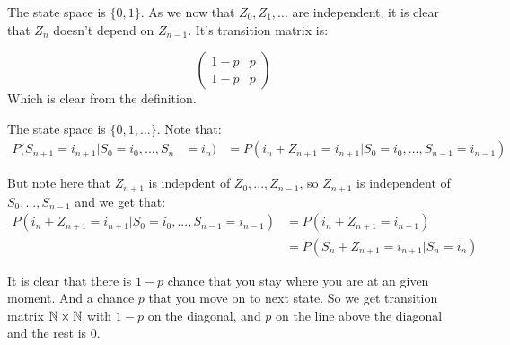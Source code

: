 
\beginproof
The state space is $\{0,1\}$. As we now that $Z_0,Z_1,...$ are independent, it is clear that $Z_n$ doesn't depend on $Z_{n-1}$. It's transition matrix is:

\[\begin{pmatrix}
1-p & p\\ 
1-p & p
\end{pmatrix}\]
Which is clear from the definition.\endproof


\beginproof
The state space is $\{0,1,...\}$.
Note that:
\begin{align*}
P(S_{n+1} = i_{n+1} | S_0 = i_0,...,S_{n} &=i_{n}) &= P(i_n+Z_{n+1}=i_{n+1} | S_0 = i_0,...,S_{n-1}=i_{n-1} )
\end{align*}

But note here that $Z_{n+1}$ is indepdent of $Z_0,...,Z_{n-1}$, so $Z_{n+1}$ is independent of $S_0,...,S_{n-1}$ and we get that:
\begin{align*}
P(i_n+Z_{n+1}=i_{n+1} | S_0 = i_0,...,S_{n-1}=i_{n-1} ) &= P(i_n+Z_{n+1}=i_{n+1})\\
&=  P(S_n+Z_{n+1}=i_{n+1} |S_n = i_n) 
\end{align*}

It is clear that there is $1-p$ chance that you stay where you are at an given moment. And a chance $p$ that you move on to next state. So we get transition matrix $\Bbb N \times \Bbb N$ with $1-p$ on the diagonal, and $p$ on the line above the diagonal and the rest is $0$.
\endproof